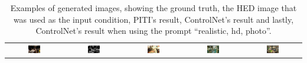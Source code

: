 \begin{table}[hbp]
{\begin{tabular}{c c c c c}
            \includegraphics[width=0.23\textwidth]{./assets/base_image_00066231.pdf} & \includegraphics[width=0.23\textwidth]{./assets/hed_image_00066231.pdf} & \includegraphics[width=0.23\textwidth]{./assets/piti_image_00066231.pdf} & \includegraphics[width=0.23\textwidth]{./assets/control_image_00066231.pdf} & \includegraphics[width=0.23\textwidth]{./assets/prompt_control_image_00066231.pdf}
        \end{tabular}
    }
    \caption{Examples of generated images, showing the ground truth, the HED image that was used as the input condition, PITI's result, ControlNet's result and lastly, ControlNet's result when using the prompt ``realistic, hd, photo''.}
    \label{tab:controlnet:example}
\end{table}

